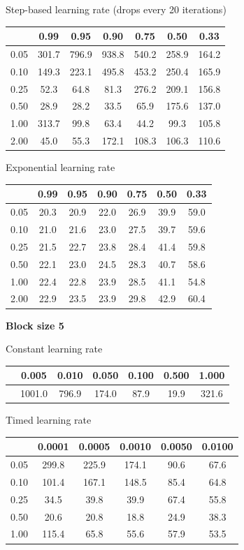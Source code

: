 \documentclass[a4paper,14pt,oneside,openany]{memoir}
\begin{document}
	Step-based learning rate (drops every 20 iterations) 
	
	\begin{tabular}{|c|c|c|c|c|c|c|}
	\hline 
	 &0.99 &0.95 &0.90 &0.75 &0.50 &0.33 \\
	 \hline 
	0.05 &301.7 &796.9 &938.8 &540.2 &258.9 &164.2 \\
	 \hline 
	0.10 &149.3 &223.1 &495.8 &453.2 &250.4 &165.9 \\
	 \hline 
	0.25 &52.3 &64.8 &81.3 &276.2 &209.1 &156.8 \\
	 \hline 
	0.50 &28.9 &28.2 &33.5 &65.9 &175.6 &137.0 \\
	 \hline 
	1.00 &313.7 &99.8 &63.4 &44.2 &99.3 &105.8 \\
	 \hline 
	2.00 &45.0 &55.3 &172.1 &108.3 &106.3 &110.6 \\
	 \hline 
	
	\end{tabular}
	
	Exponential learning rate 
	
	\begin{tabular}{|c|c|c|c|c|c|c|}
	\hline 
	 &0.99 &0.95 &0.90 &0.75 &0.50 &0.33 \\
	 \hline 
	0.05 &20.3 &20.9 &22.0 &26.9 &39.9 &59.0 \\
	 \hline 
	0.10 &21.0 &21.6 &23.0 &27.5 &39.7 &59.6 \\
	 \hline 
	0.25 &21.5 &22.7 &23.8 &28.4 &41.4 &59.8 \\
	 \hline 
	0.50 &22.1 &23.0 &24.5 &28.3 &40.7 &58.6 \\
	 \hline 
	1.00 &22.4 &22.8 &23.9 &28.5 &41.1 &54.8 \\
	 \hline 
	2.00 &22.9 &23.5 &23.9 &29.8 &42.9 &60.4 \\
	 \hline 
	
	\end{tabular}
	
	\textbf{Block size 5} 
	
	Constant learning rate 
	
	\begin{tabular}{|c|c|c|c|c|c|c|}
	\hline 
	 &0.005 &0.010 &0.050 &0.100 &0.500 &1.000 \\
	 \hline 
	 &1001.0 &796.9 &174.0 &87.9 &19.9 &321.6 \\
	 \hline 
	
	\end{tabular}
	
	Timed learning rate 
	
	\begin{tabular}{|c|c|c|c|c|c|}
	\hline 
	 &0.0001 &0.0005 &0.0010 &0.0050 &0.0100 \\
	 \hline 
	0.05 &299.8 &225.9 &174.1 &90.6 &67.6 \\
	 \hline 
	0.10 &101.4 &167.1 &148.5 &85.4 &64.8 \\
	 \hline 
	0.25 &34.5 &39.8 &39.9 &67.4 &55.8 \\
	 \hline 
	0.50 &20.6 &20.8 &18.8 &24.9 &38.3 \\
	 \hline 
	1.00 &115.4 &65.8 &55.6 &57.9 &53.5 \\
	 \hline 
	
	\end{tabular}
	
\end{document}
